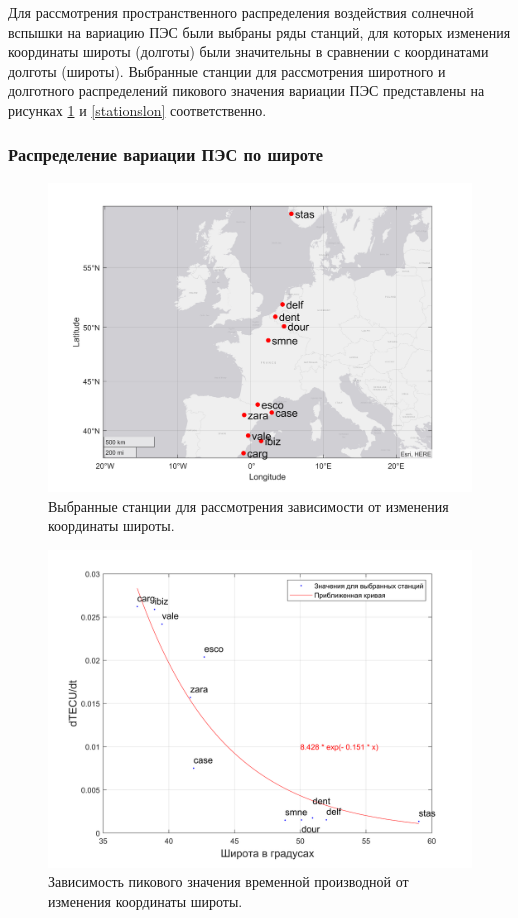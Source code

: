 \documentclass[a4paper]{article}
\begin{document}
Для рассмотрения пространственного распределения воздействия солнечной вспышки на вариацию ПЭС были выбраны ряды станций, для которых изменения координаты широты (долготы) были значительны в сравнении с координатами долготы (широты). 
Выбранные станции для рассмотрения широтного и долготного распределений пикового значения вариации ПЭС представлены на рисунках \ref{stationslat} и \ref{stationslon} соответственно.

\clearpage
\newpage
\subsubsection{Распределение вариации ПЭС по широте}

\begin{figure}[h!]
\centering
\includegraphics[width = 0.8\linewidth]{pics/clean_pics/latStations.png}
\caption{Выбранные станции для рассмотрения зависимости от изменения координаты широты.}
\label{stationslat}
\end{figure}



\begin{figure}[h!]
\centering
\includegraphics[width = 0.8\linewidth]{pics/clean_pics/dtec_lat.png}
\caption{Зависимость пикового значения временной производной от изменения координаты широты.}
\label{dteclat}
\end{figure}
\end{document}
